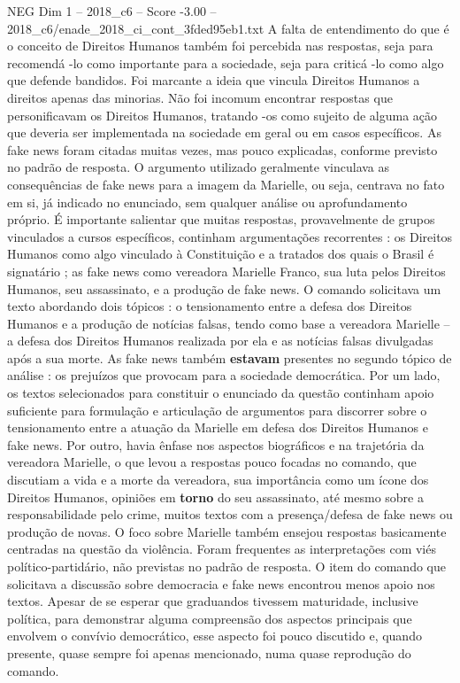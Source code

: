 \begin{textsample}{NEG Dim 1 – 2018\_c6 – Score -3.00 – 2018\_c6/enade\_2018\_ci\_cont\_3fded95eb1.txt}
A falta de entendimento do que é o conceito de Direitos Humanos também foi percebida nas respostas, seja para recomendá -lo como importante para a sociedade, seja para criticá -lo como algo que defende bandidos.
Foi marcante a ideia que vincula Direitos Humanos a direitos apenas das minorias.
Não foi incomum encontrar respostas que personificavam os Direitos Humanos, tratando -os como sujeito de alguma ação que deveria ser implementada na sociedade em geral ou em casos específicos.
As fake news foram citadas muitas vezes, mas pouco explicadas, conforme previsto no padrão de resposta.
O argumento utilizado geralmente vinculava as consequências de fake news para a imagem da Marielle, ou seja, centrava no fato em si, já indicado no enunciado, sem qualquer análise ou aprofundamento próprio.
É importante salientar que muitas respostas, provavelmente de grupos vinculados a cursos específicos, continham argumentações recorrentes : os Direitos Humanos como algo vinculado à Constituição e a tratados dos quais o Brasil é signatário ; as fake news como vereadora Marielle Franco, sua luta pelos Direitos Humanos, seu assassinato, e a produção de fake news.
O comando solicitava um texto abordando dois tópicos : o tensionamento entre a defesa dos Direitos Humanos e a produção de notícias falsas, tendo como base a vereadora Marielle – a defesa dos Direitos Humanos realizada por ela e as notícias falsas divulgadas após a sua morte.
As fake news também \textbf{estavam} presentes no segundo tópico de análise : os prejuízos que provocam para a sociedade democrática.
Por um lado, os textos selecionados para constituir o enunciado da questão continham apoio suficiente para formulação e articulação de argumentos para discorrer sobre o tensionamento entre a atuação da Marielle em defesa dos Direitos Humanos e fake news.
Por outro, havia ênfase nos aspectos biográficos e na trajetória da vereadora Marielle, o que levou a respostas pouco focadas no comando, que discutiam a vida e a morte da vereadora, sua importância como um ícone dos Direitos Humanos, opiniões em \textbf{torno} do seu assassinato, até mesmo sobre a responsabilidade pelo crime, muitos textos com a presença/defesa de fake news ou produção de novas.
O foco sobre Marielle também ensejou respostas basicamente centradas na questão da violência.
Foram frequentes as interpretações com viés político-partidário, não previstas no padrão de resposta.
O item do comando que solicitava a discussão sobre democracia e fake news encontrou menos apoio nos textos.
Apesar de se esperar que graduandos tivessem maturidade, inclusive política, para demonstrar alguma compreensão dos aspectos principais que envolvem o convívio democrático, esse aspecto foi pouco discutido e, quando presente, quase sempre foi apenas mencionado, numa quase reprodução do comando.

\end{textsample}

